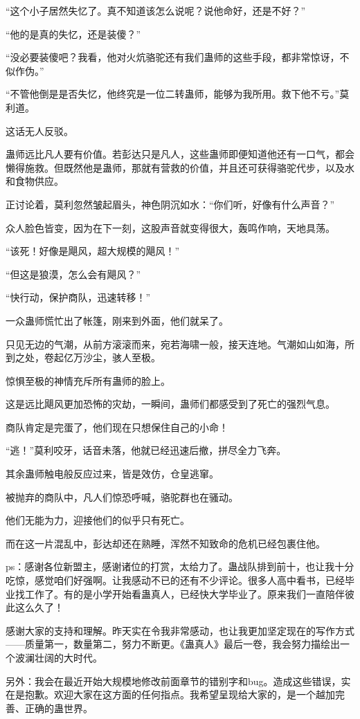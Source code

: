 \begin{this_body}
“这个小子居然失忆了。真不知道该怎么说呢？说他命好，还是不好？”

“他的是真的失忆，还是装傻？”

“没必要装傻吧？我看，他对火炕骆驼还有我们蛊师的这些手段，都非常惊讶，不似作伪。”

“不管他倒是是否失忆，他终究是一位二转蛊师，能够为我所用。救下他不亏。”莫利道。

这话无人反驳。

蛊师远比凡人要有价值。若彭达只是凡人，这些蛊师即便知道他还有一口气，都会懒得施救。但既然他是蛊师，那就有营救的价值，并且还可获得骆驼代步，以及水和食物供应。

正讨论着，莫利忽然皱起眉头，神色阴沉如水：“你们听，好像有什么声音？”

众人脸色皆变，因为在下一刻，这股声音就变得很大，轰鸣作响，天地具荡。

“该死！好像是飓风，超大规模的飓风！”

“但这是狼漠，怎么会有飓风？”

“快行动，保护商队，迅速转移！”

一众蛊师慌忙出了帐篷，刚来到外面，他们就呆了。

只见无边的气潮，从前方滚滚而来，宛若海啸一般，接天连地。气潮如山如海，所到之处，卷起亿万沙尘，骇人至极。

惊惧至极的神情充斥所有蛊师的脸上。

这是远比飓风更加恐怖的灾劫，一瞬间，蛊师们都感受到了死亡的强烈气息。

商队肯定是完蛋了，他们现在只想保住自己的小命！

“逃！”莫利咬牙，话音未落，他就已经迅速后撤，拼尽全力飞奔。

其余蛊师触电般反应过来，皆是效仿，仓皇逃窜。

被抛弃的商队中，凡人们惊恐呼喊，骆驼群也在骚动。

他们无能为力，迎接他们的似乎只有死亡。

而在这一片混乱中，彭达却还在熟睡，浑然不知致命的危机已经包裹住他。

ps：感谢各位新盟主，感谢诸位的打赏，太给力了。蛊战队排到前十，也让我十分吃惊，感觉咱们好强啊。让我感动不已的还有不少评论。很多人高中看书，已经毕业找工作了。有的是小学开始看蛊真人，已经快大学毕业了。原来我们一直陪伴彼此这么久了！

感谢大家的支持和理解。昨天实在令我非常感动，也让我更加坚定现在的写作方式——质量第一，数量第二，努力不断更。《蛊真人》最后一卷，我会努力描绘出一个波澜壮阔的大时代。

另外：我会在最近开始大规模地修改前面章节的错别字和bug。造成这些错误，实在是抱歉。欢迎大家在这方面的任何指点。我希望呈现给大家的，是一个越加完善、正确的蛊世界。

\end{this_body}


